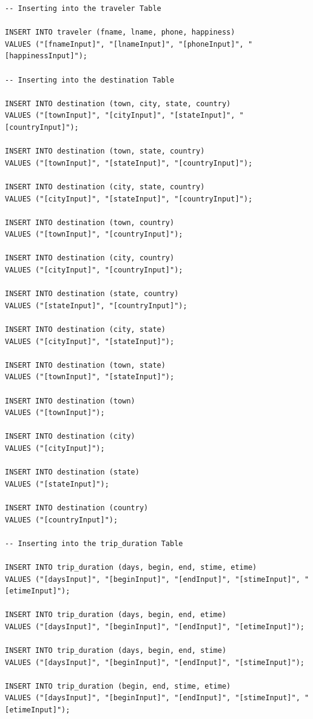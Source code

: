 \documentclass[letterpaper,10pt,onecolumn,compsoc]{IEEEtran}
\begin{document}
\begin{verbatim}
-- Inserting into the traveler Table

INSERT INTO traveler (fname, lname, phone, happiness) 
VALUES ("[fnameInput]", "[lnameInput]", "[phoneInput]", "[happinessInput]");

-- Inserting into the destination Table

INSERT INTO destination (town, city, state, country) 
VALUES ("[townInput]", "[cityInput]", "[stateInput]", "[countryInput]");

INSERT INTO destination (town, state, country) 
VALUES ("[townInput]", "[stateInput]", "[countryInput]");

INSERT INTO destination (city, state, country) 
VALUES ("[cityInput]", "[stateInput]", "[countryInput]");

INSERT INTO destination (town, country) 
VALUES ("[townInput]", "[countryInput]");

INSERT INTO destination (city, country) 
VALUES ("[cityInput]", "[countryInput]");

INSERT INTO destination (state, country) 
VALUES ("[stateInput]", "[countryInput]");

INSERT INTO destination (city, state) 
VALUES ("[cityInput]", "[stateInput]");

INSERT INTO destination (town, state) 
VALUES ("[townInput]", "[stateInput]");

INSERT INTO destination (town) 
VALUES ("[townInput]");

INSERT INTO destination (city) 
VALUES ("[cityInput]");

INSERT INTO destination (state) 
VALUES ("[stateInput]");

INSERT INTO destination (country) 
VALUES ("[countryInput]");

-- Inserting into the trip_duration Table

INSERT INTO trip_duration (days, begin, end, stime, etime) 
VALUES ("[daysInput]", "[beginInput]", "[endInput]", "[stimeInput]", "[etimeInput]");

INSERT INTO trip_duration (days, begin, end, etime) 
VALUES ("[daysInput]", "[beginInput]", "[endInput]", "[etimeInput]");

INSERT INTO trip_duration (days, begin, end, stime) 
VALUES ("[daysInput]", "[beginInput]", "[endInput]", "[stimeInput]");

INSERT INTO trip_duration (begin, end, stime, etime) 
VALUES ("[daysInput]", "[beginInput]", "[endInput]", "[stimeInput]", "[etimeInput]");


\end{verbatim}
\end{document}
